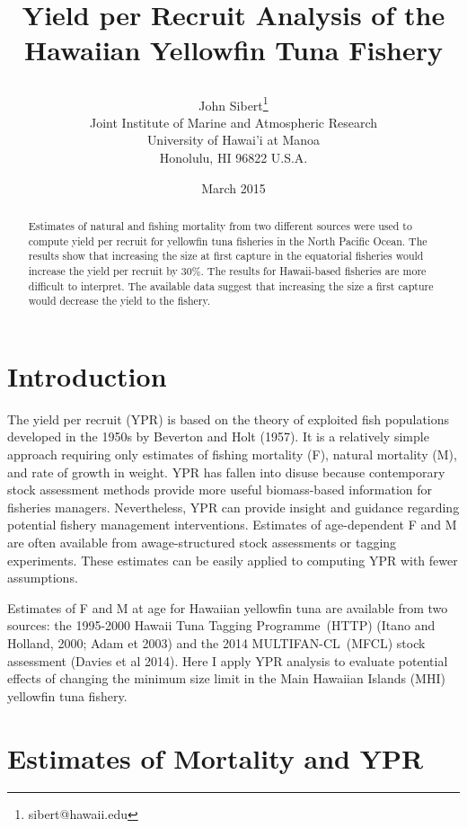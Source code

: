 \documentclass[12pt,letterpaper]{article}
\title{Yield per Recruit Analysis of the Hawaiian
Yellowfin Tuna Fishery
\date{March 2015}}
\author{
John Sibert\thanks{sibert@hawaii.edu}\\
Joint Institute of Marine and Atmospheric Research\\
University of Hawai'i at Manoa\\
Honolulu, HI  96822 U.S.A.\\[0.125in]
}
\newcommand\MFCL{MULTIFAN-CL}
\newcommand\HTTP{Hawaii Tuna Tagging Programme}
\begin{document}
\maketitle

\begin{abstract}
Estimates of natural and fishing mortality from two different sources
were used to compute yield per recruit for yellowfin tuna fisheries in
the North Pacific Ocean. The results show that increasing the size at
first capture in the equatorial fisheries would increase the yield per
recruit by 30\%. The results for Hawaii-based fisheries are more
difficult to interpret. The available data suggest that increasing the
size a first capture would decrease the yield to the fishery.
\end{abstract}

\section*{Introduction}
The yield per recruit (YPR) is based on the theory of exploited fish
populations developed in the 1950s
by Beverton and Holt (1957). It is a relatively simple
approach requiring only estimates of fishing mortality (F), natural
mortality (M), and rate of growth in weight. YPR has fallen into
disuse because contemporary stock assessment methods provide more useful
biomass-based
information for fisheries managers. 
Nevertheless, YPR can provide insight and guidance regarding potential
fishery management interventions.
Estimates of age-dependent F and M are often available from
awage-structured stock
assessments or tagging experiments. These estimates can be easily
applied to computing YPR with fewer assumptions. 

Estimates of F and M at age for Hawaiian yellowfin tuna are available
from two sources: the 1995-2000 \HTTP\ (HTTP) (Itano and Holland,
2000; Adam et 2003) and the
2014 \MFCL\ (MFCL) stock assessment (Davies et al 2014). Here I
apply YPR analysis to evaluate potential effects of changing the
minimum size limit in the Main Hawaiian Islands (MHI) yellowfin tuna
fishery.

\section*{Estimates of Mortality and YPR}
\end{document}
